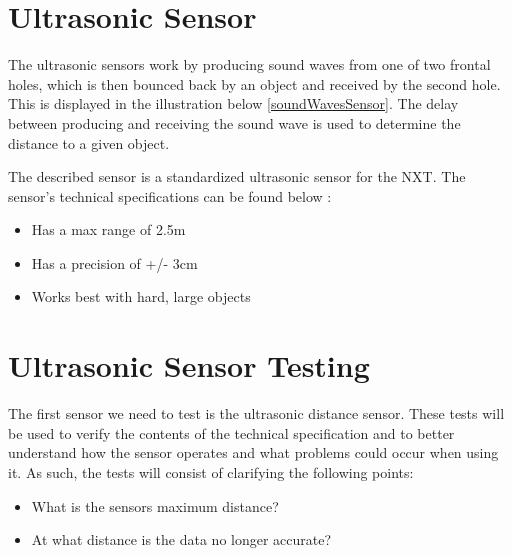 \section{Ultrasonic Sensor}\label{SensTheoUltra}
The ultrasonic sensors work by producing sound waves from one of two frontal
holes, which is then bounced back by an object and received by the second hole.
This is displayed in the illustration below \autoref{soundWavesSensor}.
The delay between producing and receiving the sound wave is used to determine
the distance to a given object.



The described sensor is a standardized ultrasonic sensor for the NXT. The
sensor's technical specifications can be found below \citep{Ultrasonic_sensor}:
\begin{itemize}
  \item Has a max range of 2.5m
  \item Has a precision of +/- 3cm
  \item Works best with hard, large objects
\end{itemize}


\section{Ultrasonic Sensor Testing}\label{SensorTest}
The first sensor we need to test is the ultrasonic distance sensor. These tests
will be used to verify the contents of the technical specification and
to better understand how the sensor operates and what
problems could occur when using it. As such, the tests will consist of
clarifying the following points:
\begin{itemize}
  \item What is the sensors maximum distance?
  \item At what distance is the data no longer accurate?
\end{itemize}

